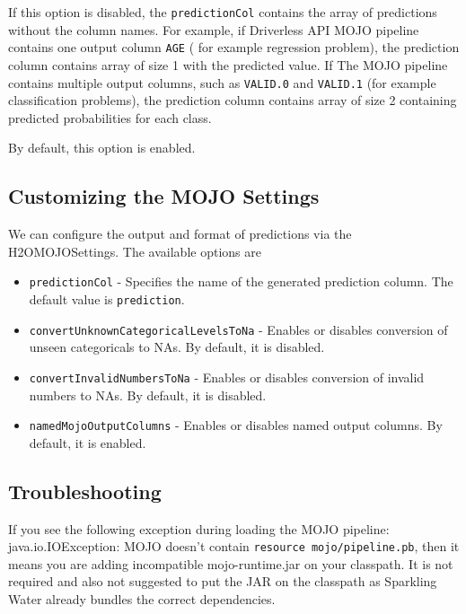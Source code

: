 If this option is disabled, the \texttt{predictionCol} contains the array of predictions without
the column names. For example, if Driverless API MOJO pipeline contains one output column \texttt{AGE} ( for example regression problem),
the prediction column contains array of size 1 with the predicted value.
If The MOJO pipeline contains multiple output columns, such as \texttt{VALID.0} and \texttt{VALID.1} (for example classification problems),
the prediction column contains array of size 2 containing predicted probabilities for each class.

By default, this option is enabled.

\subsection{Customizing the MOJO Settings}

We can configure the output and format of predictions via the H2OMOJOSettings. The available options are

\begin{itemize}
    \item \texttt{predictionCol} - Specifies the name of the generated prediction column. The default value is \texttt{prediction}.
    \item \texttt{convertUnknownCategoricalLevelsToNa} - Enables or disables conversion of unseen categoricals to NAs. By default, it is disabled.
    \item \texttt{convertInvalidNumbersToNa} - Enables or disables conversion of invalid numbers to NAs. By default, it is disabled.
    \item \texttt{namedMojoOutputColumns} - Enables or disables named output columns. By default, it is enabled.
\end{itemize}


\subsection{Troubleshooting}

If you see the following exception during loading the MOJO pipeline:\\
java.io.IOException: MOJO doesn't contain \texttt{resource mojo/pipeline.pb}, then it means you are adding
incompatible mojo-runtime.jar on your classpath. It is not required and also not suggested
to put the JAR on the classpath as Sparkling Water already bundles the correct dependencies.

